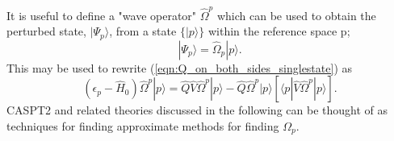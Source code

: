 It is useful to define a "wave operator" $\hat{\Omega}^{p}$ which can be used to obtain the perturbed state, $|\Psi_{p}\rangle$,
from a state $\{ |p\rangle \}$ within the reference space $\mathrm{p}$;
\begin{equation}
|\Psi_{p} \rangle = \hat{\Omega}_{p}|p\rangle .
\end{equation}
This may be used to rewrite (\ref{eqn:Q_on_both_sides_singlestate}) as 
\begin{equation}
( \epsilon_{p}- \hat{H}_{0} )\hat{\Omega}^{p}|p\rangle = 
\hat{Q}\hat{V}\hat{\Omega}^{p}|p \rangle -  \hat{Q}\hat{\Omega}^{p}|p\rangle[\langle p | \hat{V}\hat{\Omega}^{p} |p \rangle]. 
\label{eqn:BlochSingleState}
\end{equation}
CASPT2 and related theories discussed in the following can be thought of as techniques for finding approximate methods for finding $\Omega_{p}$. 

